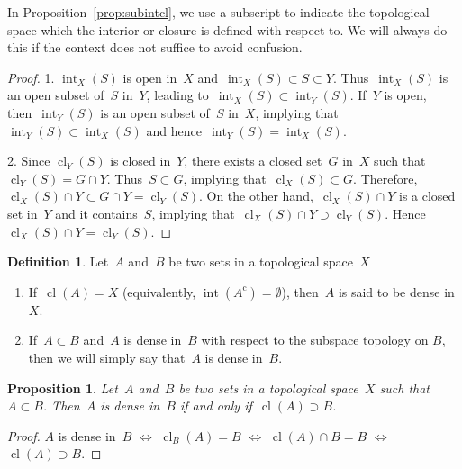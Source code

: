 \documentclass[11pt,a4paper]{article}  %
\newtheorem{proposition}{Proposition}[section]
\theoremstyle{definition}
\newtheorem{definition}{Definition}[section]
\newcommand{\co}{{\mathrm{c}}}
\DeclareMathOperator{\inter}{int}
\DeclareMathOperator{\cl}{cl}
\numberwithin{equation}{section}
\begin{document}
In Proposition~\ref{prop:subintcl}, we use a subscript to indicate the topological space which the
interior or closure is defined with respect to. We will always do this if the context does not
suffice to avoid confusion.

\begin{proof}
  1. $\inter_X(S)$ is open in~$X$ and~$\inter_X(S)\subset S\subset Y$. Thus~$\inter_X(S)$ is an open
     subset of~$S$ in~$Y$, leading to~$\inter_X(S)\subset \inter_Y(S)$. If~$Y$ is open,
     then~$\inter_Y(S)$ is an open subset of~$S$ in~$X$, implying that~$\inter_Y(S)\subset
     \inter_X(S)$ and hence~$\inter_Y(S) = \inter_X(S)$.

  2. %
     Since $\cl_Y(S)$ is closed in~$Y$, there exists a closed set~$G$ in~$X$ such
     that~$\cl_Y(S)= G\cap Y$. Thus~$S\subset  G$, implying that~$\cl_X(S) \subset G$.
     Therefore,~$\cl_X(S)\cap Y \subset G\cap Y = \cl_Y(S)$.  On the other hand,~$\cl_X(S)\cap Y$ is
     a closed set in~$Y$ and it contains~$S$, implying that~$\cl_X(S)\cap Y \supset \cl_Y(S)$.
     Hence~$\cl_X(S)\cap Y = \cl_Y(S)$.
\end{proof}

\begin{definition}
  \label{def:dense}
  Let~$A$ and~$B$ be two sets in a topological space~$X$
  \begin{enumerate}
      \item If~$\cl(A) = X$ (equivalently, $\inter(A^\co) = \emptyset$), then~$A$ is said to be dense in~$X$.
    \item If~$A\subset B$ and~$A$ is dense in~$B$ with respect to the subspace topology on $B$,
    then we will simply say that~$A$ is dense in~$B$.
  \end{enumerate}
\end{definition}

\begin{proposition}
  \label{prop:densein}
  Let~$A$ and~$B$ be two sets in a topological space~$X$ such that~$A\subset B$. Then~$A$ is dense
  in~$B$ if and only if~$\cl(A) \supset B$.
\end{proposition}

\begin{proof}
  $A$ is dense in~$B$ $\Leftrightarrow $ $\cl_B(A) = B$ $\Leftrightarrow$ $\cl(A)\cap B = B$
  $\Leftrightarrow$ $\cl(A) \supset B$.
\end{proof}
\end{document}
